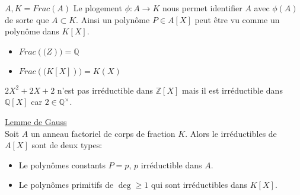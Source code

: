 \begin{remarque}
	$A, K  = Frac(A)$ Le plogement $\phi: A \to K$ nous permet identifier $A$ avec $\phi(A)$ de sorte que $A \subset K$.
	Ainsi un polynôme $P \in A[X]$  peut être vu comme un polynôme dans $K[X]$.
\end{remarque}

\begin{example}
	\begin{itemize}
		\item $Frac(\mathbb(Z)) = \mathbb{Q}$
		\item $Frac(\mathbb(K[X])) = K(X)$
	\end{itemize}
\end{example}

\begin{example}
	$2X^2 + 2X +2$ n'est pas irréductible dans $\mathbb{Z}[X]$ mais il est irréductible dans $\mathbb{Q}[X]$ car $2 \in \mathbb{Q}^\times$.
\end{example}



\begin{theorem} \href{https://fr.wikipedia.org/wiki/Lemme_de_Gauss_(polyn%C3%B4mes)#Applications}{Lemme de Gauss}\\
	Soit $A$ un anneau factoriel de corps de fraction $K$.
	Alors le irréductibles de $A[X]$ sont de deux types:
	\begin{itemize}
		\item Le polynômes constants $P = p$,  $p$ irréductible dans $A$.
		\item Le polynômes primitifs de $\deg \geq 1 $ qui sont irréductibles dans $K[X]$.
	\end{itemize}
\end{theorem}


